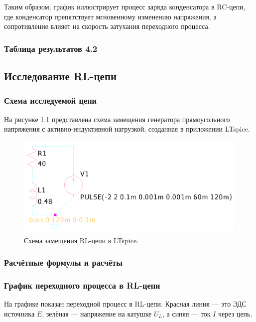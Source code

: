 Таким образом, график иллюстрирует процесс заряда конденсатора в RC-цепи, где конденсатор препятствует мгновенному изменению напряжения, а сопротивление влияет на скорость затухания переходного процесса. 

\subsubsection{Таблица результатов 4.2}




\newpage
\subsection{Исследование RL-цепи}

\subsubsection{Схема исследуемой цепи}
На рисунке 1.1 представлена схема замещения генератора прямоугольного напряжения с активно-индуктивной нагрузкой, созданная в приложении LTspice.

\begin{figure}[H]
	\centering
	\includegraphics[width=1\textwidth]{./data/rl-schema.png}
	\caption{Схема замещения RL-цепи в LTspice.}
\end{figure}

\subsubsection{Расчётные формулы и расчёты}


\subsubsection{График переходного процесса в RL-цепи}
На графике показан переходной процесс в RL-цепи. Красная линия — это ЭДС источника \( E \), зелёная — напряжение на катушке \( U_L \), а синяя — ток \( I \) через цепь.

